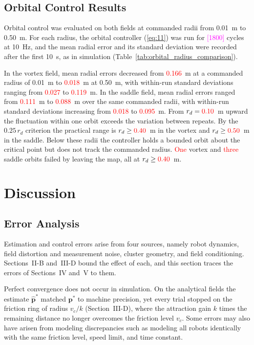 \documentclass[lettersize,journal]{IEEEtran}
\newcommand{\syn}[1]{\textcolor{red}{#1}}            %
\newcommand{\open}[1]{\textcolor{magenta}{[#1]}}     %
\begin{document}
\subsection{Orbital Control Results}

Orbital control was evaluated on both fields at commanded radii from 0.01~m to 0.50~m. For each radius, the orbital controller (\ref{eq:11}) was run for \open{1800} cycles at 10~Hz, and the mean radial error and its standard deviation were recorded after the first 10~s, as in simulation (Table~\ref{tab:orbital_radius_comparison}). %

 In the vortex field, mean radial errors decreased from \syn{0.166}~m at a commanded radius of 0.01~m to \syn{0.018}~m at 0.50~m, with within-run standard deviations ranging from \syn{0.027} to \syn{0.119}~m. In the saddle field, mean radial errors ranged from \syn{0.111}~m to \syn{0.088}~m over the same commanded radii, with within-run standard deviations increasing from \syn{0.018} to \syn{0.095}~m. From $r_d = \syn{0.10}$~m upward the fluctuation within one orbit exceeds the variation between repeats. By the $0.25\,r_d$ criterion the practical range is $r_d \ge \syn{0.40}$~m in the vortex and $r_d \ge \syn{0.50}$~m in the saddle. Below these radii the controller holds a bounded orbit about the critical point but does not track the commanded radius. \syn{One} vortex and \syn{three} saddle orbits failed by leaving the map, all at $r_d \ge \syn{0.40}$~m. %




\section{Discussion}

\subsection{Error Analysis}

Estimation and control errors arise from four sources, namely robot dynamics, field distortion and measurement noise, cluster geometry, and field conditioning. Sections~II-B and~III-D bound the effect of each, and this section traces the errors of Sections~IV and~V to them.

Perfect convergence does not occur in simulation. On the analytical fields the estimate $\hat{\mathbf{p}}^*$ matched $\mathbf{p}^*$ to machine precision, yet every trial stopped on the friction ring of radius $v_c/k$ (Section~III-D), where the attraction gain $k$ times the remaining distance no longer overcomes the friction level $v_c$. Some errors may also have arisen from modeling discrepancies such as modeling all robots identically with the same friction level, speed limit, and time constant. %
\end{document}
